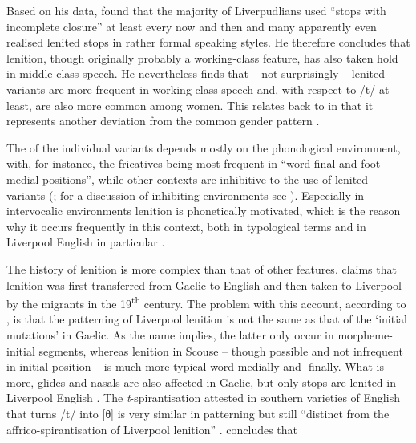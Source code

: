 Based on his \citeyear{knowles1973} data, \citeauthor{knowles1973} found that the majority of Liverpudlians used ``stops with incomplete closure'' at least every now and then and many apparently even realised lenited stops in rather formal speaking styles.
He therefore concludes that lenition, though originally probably a working-class feature, has also taken hold in middle-class speech.
He nevertheless finds that -- not surprisingly -- lenited variants are more frequent in working-class speech and, with respect to /t/ at least, are also more common among women.
This relates back to  in that it represents another deviation from the common gender pattern \citeyearpar[cf.][325--327]{knowles1973}.

The  of the individual variants depends mostly on the phonological environment, with, for instance, the fricatives being most frequent in ``word-final and foot-medial positions'', while other contexts are inhibitive to the use of lenited variants (\citealp[cf.][130]{honeybone2007}; for a discussion of inhibiting environments see \citealt{honeybone2001}).
Especially in intervocalic environments lenition is phonetically motivated, which is the reason why it occurs frequently in this context, both in typological terms and in Liverpool English in particular \parencite[cf.][230 and 243]{honeybone2001}.

\largerpage 
The history of lenition is more complex than that of other features.
\textcite{hickey1996} claims that lenition was first transferred from  Gaelic to  English and then taken to Liverpool by the  migrants in the 19\textsuperscript{th} century.
The problem with this account, according to \citet{honeybone2007}, is that the patterning of Liverpool lenition is not the same as that of the `initial mutations' in  Gaelic.
As the name implies, the latter only occur in morpheme-initial segments, whereas lenition in Scouse -- though possible and not infrequent in initial position -- is much more typical word-medially and -finally.
What is more, glides and nasals are also affected in Gaelic, but only stops are lenited in Liverpool English \citep[cf.][131]{honeybone2007}.
The \emph{t}-spirantisation attested in southern varieties of  English that turns /t/ into [θ] is very similar in patterning but still ``distinct from the affrico-spirantisation of Liverpool lenition'' \citep[132]{honeybone2007}.
\citeauthor{honeybone2007} concludes that

